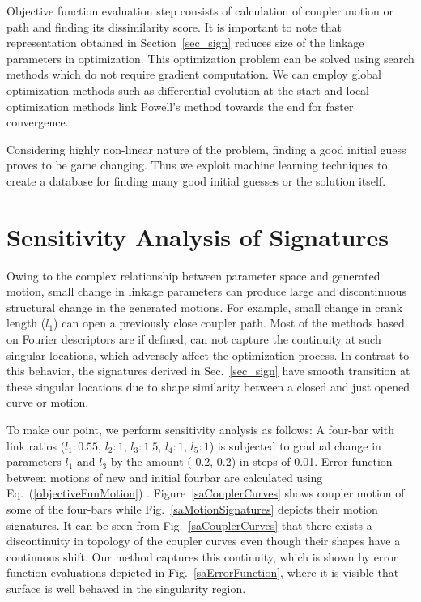 \documentclass[twocolumn,10pt]{asme2e}
\newcommand{\req}[1]{(\ref{#1})}
\begin{document}
Objective function evaluation step consists of calculation of coupler motion or path and finding its dissimilarity score.
It is important to note that representation obtained in Section~\ref{sec_sign} reduces size of the linkage parameters in optimization.
This optimization problem can be solved using search methods which do not require gradient computation.
We can employ global optimization methods such as differential evolution at the start and local optimization methods link Powell's method towards the end for faster convergence\cite{ullah1997}.

Considering highly non-linear nature of the problem, finding a good initial guess proves to be game changing.
Thus we exploit machine learning techniques to create a database for finding many good initial guesses or the solution itself.

\section{Sensitivity Analysis of Signatures}\label{sec_SA}
Owing to the complex relationship between parameter space and generated motion, small change in linkage parameters can produce large and discontinuous structural change in the generated motions.
For example, small change in crank length ($l_1$) can open a previously close coupler path.
Most of the methods based on Fourier descriptors are if defined, can not capture the continuity at such singular locations, which adversely affect the optimization process.
In contrast to this behavior, the signatures derived in Sec.~\ref{sec_sign} have smooth transition at these singular locations due to shape similarity between a closed and just opened curve or motion.

To make our point, we perform sensitivity analysis as follows:
A four-bar with link ratios ($l_1:0.55$, $l_2:1$, $l_3:1.5$, $l_4:1$, $l_5:1$) is subjected to gradual change in parameters $l_1$ and $l_3$ by the amount (-0.2, 0.2) in steps of 0.01.
Error function between motions of new and initial fourbar are calculated using Eq.~\req{objectiveFunMotion} .
Figure~\ref{saCouplerCurves} shows coupler motion of some of the four-bars while Fig.~\ref{saMotionSignatures} depicts their motion signatures.
It can be seen from Fig.~\ref{saCouplerCurves} that there exists a discontinuity in topology of the coupler curves even though their shapes have a continuous shift.
Our method captures this continuity, which is shown by error function evaluations depicted in Fig.~\ref{saErrorFunction}, where it is visible that surface is well behaved in the singularity region.
\end{document}
